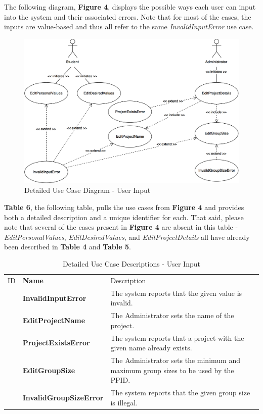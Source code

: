 \documentclass[12pt,letterpaper]{article}
\begin{document}
The following diagram, {\bf Figure 4}, displays the possible ways each user can input into the system and their associated errors. Note that for most of the cases, the inputs are value-based and thus
all refer to the same {\it InvalidInputError} use case.

\begin{figure}[H]
	\centering{}
	\includegraphics[scale=0.3]{imgs/detailed-user-input-use-case-diagram.png}
	\caption{Detailed Use Case Diagram - User Input}
\end{figure}

{\bf Table 6}, the following table, pulls the use cases from {\bf Figure 4} and provides both a detailed description and a unique identifier for each. That said, please note that several of the cases present in {\bf Figure 4}
are absent in this table - {\it EditPersonalValues}, {\it EditDesiredValues}, and {\it EditProjectDetails} all have already been described in {\bf Table 4} and {\bf Table 5}.

\begin{table}[H]
	\caption{Detailed Use Case Descriptions - User Input}
	\begin{tabu} to 
	    \tableheader{}ID & Name & Description\\
		\invalidinputerror{} & InvalidInputError & The system reports that the given value is invalid.\\
		\editprojectname{} & EditProjectName & The Administrator sets the name of the project. \\
		\projectexistserror{} & ProjectExistsError & The system reports that a project with the given name already exists.\\
		\editgroupsize{} & EditGroupSize & The Administrator sets the minimum and maximum group sizes to be used by the PPID. \\
		\invalidgroupsizeerror{} & InvalidGroupSizeError & The system reports that the given group size is illegal.\\
	\end{tabu}
\end{table}
\end{document}
